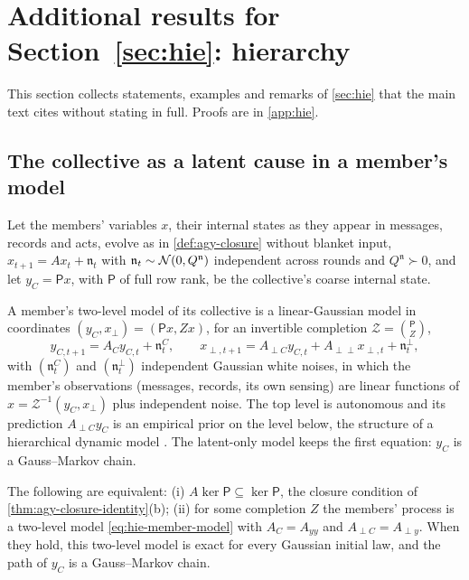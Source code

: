 \section{Additional results for \texorpdfstring{Section~\ref{sec:hie}}{Section 12}: hierarchy}\label{sup:hie}

This section collects statements, examples and remarks of \cref{sec:hie} that the main text cites without stating in full. Proofs are in \cref{app:hie}.

\subsection{The collective as a latent cause in a member's model}\label{sec:hie-latent}

Let the members' variables $x$, their internal states as they appear in messages, records and acts, evolve as in \cref{def:agy-closure} without blanket input, $x_{t+1}=Ax_t+\mathfrak n_t$ with $\mathfrak n_t\sim\mathcal{N}(0,Q^{\mathfrak n})$ independent across rounds and $Q^{\mathfrak n}\succ0$, and let $y_C=\mathsf Px$, with $\mathsf P$ of full row rank, be the collective's coarse internal state.

\begin{definition}\label{def:hie-member-model}
A member's two-level model of its collective is a linear-Gaussian model in coordinates $(y_C,x_\perp)=(\mathsf Px,Zx)$, for an invertible completion $\mathcal Z=\binom{\mathsf P}{Z}$,
\begin{equation}\label{eq:hie-member-model}
y_{C,t+1}=A_Cy_{C,t}+\mathfrak n^C_t,\qquad x_{\perp,t+1}=A_{\perp C}y_{C,t}+A_{\perp\perp}x_{\perp,t}+\mathfrak n^\perp_t,
\end{equation}
with $(\mathfrak n^C_t)$ and $(\mathfrak n^\perp_t)$ independent Gaussian white noises, in which the member's observations (messages, records, its own sensing) are linear functions of $x=\mathcal Z^{-1}(y_C,x_\perp)$ plus independent noise. The top level is autonomous and its prediction $A_{\perp C}y_C$ is an empirical prior on the level below, the structure of a hierarchical dynamic model \citep{friston2008hierarchical}. The latent-only model keeps the first equation: $y_C$ is a Gauss--Markov chain.
\end{definition}

\begin{proposition}\label{prop:hie-closure-exact}
The following are equivalent: (i) $A\ker\mathsf P\subseteq\ker\mathsf P$, the closure condition of \cref{thm:agy-closure-identity}(b); (ii) for some completion $Z$ the members' process is a two-level model \eqref{eq:hie-member-model} with $A_C=A_{yy}$ and $A_{\perp C}=A_{\perp y}$. When they hold, this two-level model is exact for every Gaussian initial law, and the path of $y_C$ is a Gauss--Markov chain.
\end{proposition}

